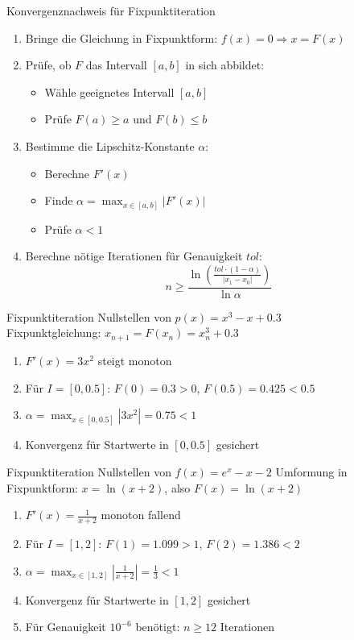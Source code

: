 \begin{KR}{Konvergenznachweis für Fixpunktiteration}
\begin{enumerate}
    \item Bringe die Gleichung in Fixpunktform: $f(x)=0 \Rightarrow x = F(x)$
    \item Prüfe, ob $F$ das Intervall $[a,b]$ in sich abbildet:
    \begin{itemize}
        \item Wähle geeignetes Intervall $[a,b]$
        \item Prüfe $F(a) \geq a$ und $F(b) \leq b$
    \end{itemize}
    \item Bestimme die Lipschitz-Konstante $\alpha$:
    \begin{itemize}
        \item Berechne $F'(x)$
        \item Finde $\alpha = \max_{x \in [a,b]} |F'(x)|$
        \item Prüfe $\alpha < 1$
    \end{itemize}
    \item Berechne nötige Iterationen für Genauigkeit $tol$:
    $$n \geq \frac{\ln(\frac{tol \cdot (1-\alpha)}{|x_1-x_0|})}{\ln \alpha}$$
\end{enumerate}
\end{KR}


\begin{example2}{Fixpunktiteration} Nullstellen von $p(x)=x^3-x+0.3$\\
Fixpunktgleichung: $x_{n+1} = F(x_n) = x_n^3 + 0.3$
\begin{enumerate}
    \item $F'(x) = 3x^2$ steigt monoton
    \item Für $I=[0,0.5]$: $F(0)=0.3 > 0$, $F(0.5)=0.425 < 0.5$
    \item $\alpha = \max_{x \in [0,0.5]} |3x^2| = 0.75 < 1$
    \item Konvergenz für Startwerte in $[0,0.5]$ gesichert
\end{enumerate}
\end{example2}

\begin{example2}{Fixpunktiteration} Nullstellen von $f(x)=e^x - x - 2$
Umformung in Fixpunktform: $x = \ln(x+2)$, also $F(x)=\ln(x+2)$
\begin{enumerate}
    \item $F'(x) = \frac{1}{x+2}$ monoton fallend
    \item Für $I=[1,2]$: $F(1)=1.099 > 1$, $F(2)=1.386 < 2$
    \item $\alpha = \max_{x \in [1,2]} |\frac{1}{x+2}| = \frac{1}{3} < 1$
    \item Konvergenz für Startwerte in $[1,2]$ gesichert
    \item Für Genauigkeit $10^{-6}$ benötigt: $n \geq 12$ Iterationen
\end{enumerate}
\end{example2}

